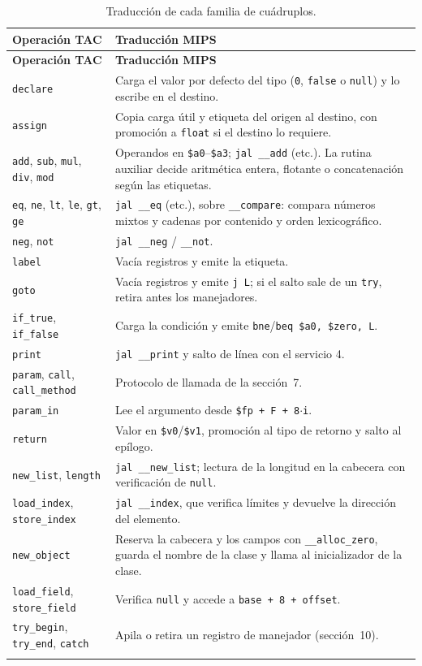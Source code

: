 \documentclass[11pt,a4paper]{article}
\begin{document}
\begin{longtable}{@{}L{3.6cm}L{10.6cm}@{}}
\toprule
\textbf{Operación TAC} & \textbf{Traducción MIPS} \\
\midrule
\endfirsthead
\toprule
\textbf{Operación TAC} & \textbf{Traducción MIPS} \\
\midrule
\endhead
\texttt{declare} & Carga el valor por defecto del tipo (\texttt{0},
\texttt{false} o \texttt{null}) y lo escribe en el destino. \\
\texttt{assign} & Copia carga útil y etiqueta del origen al destino, con
promoción a \texttt{float} si el destino lo requiere. \\
\texttt{add}, \texttt{sub}, \texttt{mul}, \texttt{div}, \texttt{mod} &
Operandos en \texttt{\$a0}--\texttt{\$a3}; \texttt{jal \_\_add} (etc.). La rutina
auxiliar decide aritmética entera, flotante o concatenación según las
etiquetas. \\
\texttt{eq}, \texttt{ne}, \texttt{lt}, \texttt{le}, \texttt{gt}, \texttt{ge} &
\texttt{jal \_\_eq} (etc.), sobre \texttt{\_\_compare}: compara números mixtos y
cadenas por contenido y orden lexicográfico. \\
\texttt{neg}, \texttt{not} & \texttt{jal \_\_neg} / \texttt{\_\_not}. \\
\texttt{label} & Vacía registros y emite la etiqueta. \\
\texttt{goto} & Vacía registros y emite \texttt{j L}; si el salto sale de un
\texttt{try}, retira antes los manejadores. \\
\texttt{if\_true}, \texttt{if\_false} & Carga la condición y emite
\texttt{bne}/\texttt{beq \$a0, \$zero, L}. \\
\texttt{print} & \texttt{jal \_\_print} y salto de línea con el servicio 4. \\
\texttt{param}, \texttt{call}, \texttt{call\_method} & Protocolo de llamada de
la sección~7. \\
\texttt{param\_in} & Lee el argumento desde \texttt{\$fp + F + 8$\cdot$i}. \\
\texttt{return} & Valor en \texttt{\$v0}/\texttt{\$v1}, promoción al tipo de
retorno y salto al epílogo. \\
\texttt{new\_list}, \texttt{length} & \texttt{jal \_\_new\_list}; lectura de la
longitud en la cabecera con verificación de \texttt{null}. \\
\texttt{load\_index}, \texttt{store\_index} & \texttt{jal \_\_index}, que
verifica límites y devuelve la dirección del elemento. \\
\texttt{new\_object} & Reserva la cabecera y los campos con
\texttt{\_\_alloc\_zero}, guarda el nombre de la clase y llama al inicializador
de la clase. \\
\texttt{load\_field}, \texttt{store\_field} & Verifica \texttt{null} y accede a
\texttt{base + 8 + offset}. \\
\texttt{try\_begin}, \texttt{try\_end}, \texttt{catch} & Apila o retira un
registro de manejador (sección~10). \\
\bottomrule
\caption{Traducción de cada familia de cuádruplos.}
\end{longtable}
\end{document}
